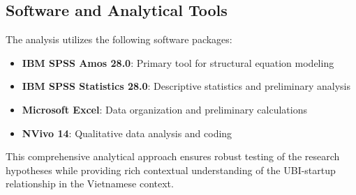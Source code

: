 \documentclass[../Main.tex]{subfiles}%
\begin{document}
	\subsection{Software and Analytical Tools}
	The analysis utilizes the following software packages:
	\begin{itemize}
		\item \textbf{IBM SPSS Amos 28.0}: Primary tool for structural equation modeling
		\item \textbf{IBM SPSS Statistics 28.0}: Descriptive statistics and preliminary analysis
		\item \textbf{Microsoft Excel}: Data organization and preliminary calculations
		\item \textbf{NVivo 14}: Qualitative data analysis and coding
	\end{itemize}
	
	This comprehensive analytical approach ensures robust testing of the research hypotheses while providing rich contextual understanding of the UBI-startup relationship in the Vietnamese context.
	
\end{document}
